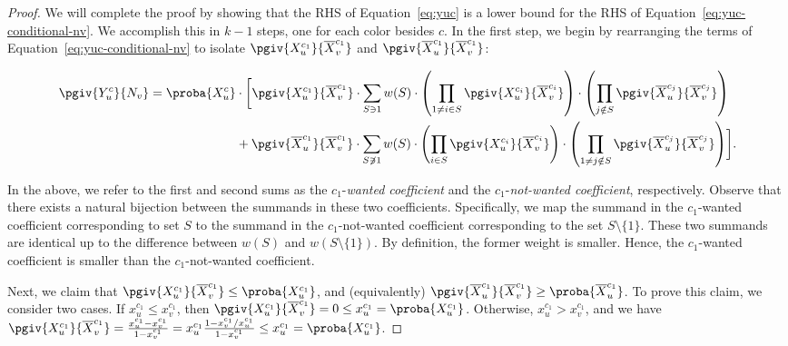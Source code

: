 \begin{proof}
	We will complete the proof by showing that the RHS of Equation~\eqref{eq:yuc} is a lower bound for the RHS of Equation~\eqref{eq:yuc-conditional-nv}. We accomplish this in $k - 1$ steps, one for each color besides $c$.
	In the first step, we begin by rearranging the terms of Equation~\eqref{eq:yuc-conditional-nv} to isolate $\pgiv{X_u^{c_1}}{\overline{X}_v^{c_1}}$ and $\pgiv{\overline{X}_u^{c_1}}{\overline{X}_v^{c_1}}$:

	\begin{align*}
		\begin{split}
			\pgiv{Y_u^c}{N_v} = \proba{X_u^c} & \cdot \biggl[ \pgiv{X_u^{c_1}}{\overline{X}_v^{c_1}}\cdot\sum_{S \ni 1} w(S)\cdot \left( \prod_{1 \neq i \in S}\pgiv{X_u^{c_i}}{\overline{X}_v^{c_i}}\right)\cdot\left(\prod_{j \notin S}\pgiv{\overline{X}_u^{c_j}}{\overline{X}_v^{c_j}}\right)                \\
			                                  & + \pgiv{\overline{X}_u^{c_1}}{\overline{X}_v^{c_1}}\cdot \sum_{S \not\ni 1} w(S) \cdot  \left( \prod_{i \in S}\pgiv{X_u^{c_i}}{\overline{X}_v^{c_i}}\right)\cdot\left(\prod_{1 \neq j \notin S}\pgiv{\overline{X}_u^{c_j}}{\overline{X}_v^{c_j}}\right) \biggr].
		\end{split}
	\end{align*}

	In the above, we refer to the first and second sums as the $c_1$-\emph{wanted coefficient} and the $c_1$-\emph{not-wanted coefficient}, respectively.
	Observe that there exists a natural bijection between the summands in these two coefficients. Specifically, we map the summand in the $c_1$-wanted coefficient
	corresponding to set $S$ to the summand in the $c_1$-not-wanted coefficient corresponding to the set $S \setminus \{1\}$. These two summands are identical up to the
	difference between $w(S)$ and $w(S \setminus \{1\})$. By definition, the former weight is smaller. Hence, the $c_1$-wanted coefficient is smaller than
	the $c_1$-not-wanted coefficient.

	Next, we claim that $\pgiv{X_u^{c_1}}{\overline{X}_v^{c_1}} \leq \proba{X_u^{c_1}}$, and (equivalently) $\pgiv{\overline{X}_u^{c_1}}{\overline{X}_v^{c_1}} \geq \proba{\overline{X}_u^{c_1}}$.
	To prove this claim, we consider two cases. If $x_u^{c_1} \leq x_v^{c_1}$, then $\pgiv{X_u^{c_1}}{\overline{X}_v^{c_1}} = 0 \leq x_u^{c_1} = \proba{X_u^{c_1}}$. Otherwise, $x_u^{c_1} > x_v^{c_1}$, and we
	have $\pgiv{X_u^{c_1}}{\overline{X}_v^{c_1}} = \frac{x_u^{c_1} - x_v^{c_1}}{1 - x_v^{c_1}} = x_u^{c_1}\frac{1 - x_v^{c_1}/x_u^{c_1}}{1 - x_v^{c_1}} \leq x_u^{c_1} = \proba{X_u^{c_1}}$.


\end{proof}
